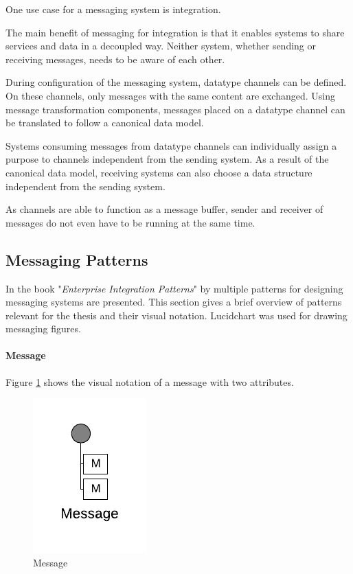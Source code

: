 One use case for a messaging system is integration.

The main benefit of messaging for integration is that it enables systems to share services and data in a decoupled way. Neither system, whether sending or receiving messages, needs to be aware of each other. 

During configuration of the messaging system, datatype channels can be defined. On these channels, only messages with the same content are exchanged. Using message transformation components, messages placed on a datatype channel can be translated to follow a canonical data model.

Systems consuming messages from datatype channels can individually assign a purpose to channels independent from the sending system. As a result of the canonical data model, receiving systems can also choose a data structure independent from the sending system.

As channels are able to function as a message buffer, sender and receiver of messages do not even have to be running at the same time.

\subsection{Messaging Patterns}

In the book "\textit{Enterprise Integration Patterns}" by \cite{EIP} multiple patterns for designing messaging systems are presented. This section gives a brief overview of patterns relevant for the thesis and their visual notation. Lucidchart \cite{lucid} was used for drawing messaging figures.

\paragraph{Message}

Figure \ref{messaging:message} shows the visual notation of a message with two attributes. 

\begin{figure}[H]
    \centering
    \includegraphics[scale=0.6]{Diagrams/Messaging/1. Message.pdf}
    \caption{Message}
    \label{messaging:message}
\end{figure}

